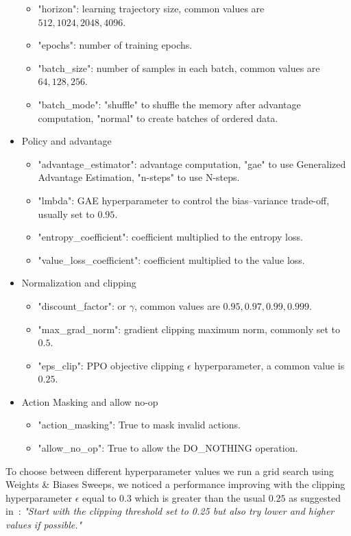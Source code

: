 \documentclass[11pt, a4paper, hidelinks]{report}
\begin{document}
\begin{itemize}
\begin{itemize}
		\item "horizon": learning trajectory size, common values are $512, 1024, 2048, 4096$.
		\item "epochs": number of training epochs.
		\item "batch\_size": number of samples in each batch, common values are $64, 128, 256$.
		\item "batch\_mode": "shuffle" to shuffle the memory after advantage computation, "normal" to create batches of ordered data.
	\end{itemize}
	\item Policy and advantage
	\begin{itemize}
		\item "advantage\_estimator": advantage computation, "gae" to use Generalized Advantage Estimation, "n-steps" to use N-steps.
		\item "lmbda": GAE hyperparameter to control the bias–variance trade-off, usually set to $0.95$.
		\item "entropy\_coefficient": coefficient multiplied to the entropy loss.
		\item "value\_loss\_coefficient": coefficient multiplied to the value loss.
	\end{itemize}
	\item Normalization and clipping
	\begin{itemize}
		\item "discount\_factor": or $\gamma$, common values are $0.95, 0.97, 0.99, 0.999$.
		\item "max\_grad\_norm": gradient clipping maximum norm, commonly set to $0.5$.
		\item "eps\_clip": PPO objective clipping $\epsilon$ hyperparameter, a common value is $0.25$.
	\end{itemize}
	\item Action Masking and allow no-op
	\begin{itemize}
		\item "action\_masking": True to mask invalid actions.
		\item "allow\_no\_op": True to allow the DO\_NOTHING operation.
	\end{itemize}
\end{itemize}

To choose between different hyperparameter values we run a grid search using Weights \& Biases Sweeps, we noticed a performance improving with the clipping hyperparameter $\epsilon$ equal to $0.3$ which is greater than the usual $0.25$ as suggested in~\citep{ppo-implementation-2}: \textit{"Start with the clipping threshold set to 0.25 but also try lower and higher values if possible."}
\end{document}

